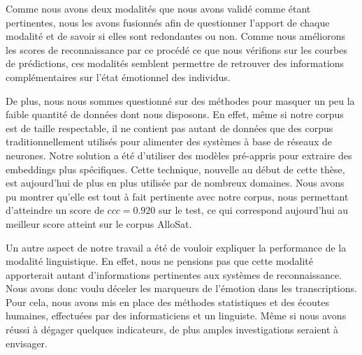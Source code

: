 Comme nous avons deux modalités que nous avons validé comme étant pertinentes, nous les avons fusionnés afin de questionner l'apport de chaque modalité et de savoir si elles sont redondantes ou non. Comme nous améliorons les scores de reconnaissance par ce procédé ce que nous vérifions sur les courbes de prédictions, ces modalités semblent permettre de retrouver des informations complémentaires sur l'état émotionnel des individus.

De plus, nous nous sommes questionné sur des méthodes pour masquer un peu la faible quantité de données dont nous disposons. En effet, même si notre corpus est de taille respectable, il ne contient pas autant de données que des corpus traditionnellement utilisés pour alimenter des systèmes à base de réseaux de neurones. Notre solution a été d'utiliser des modèles pré-appris pour extraire des embeddings plus spécifiques. Cette technique, nouvelle au début de cette thèse, est aujourd'hui de plus en plus utilisée par de nombreux domaines. Nous avons pu montrer qu'elle est tout à fait pertinente avec notre corpus, nous permettant d’atteindre un score de $ccc=0.920$ sur le test, ce qui correspond aujourd'hui au meilleur score atteint sur le corpus AlloSat.

Un autre aspect de notre travail a été de vouloir expliquer la performance de la modalité linguistique. En effet, nous ne pensions pas que cette modalité apporterait autant d'informations pertinentes aux systèmes de reconnaissance. Nous avons donc voulu déceler les marqueurs de l'émotion dans les transcriptions. Pour cela, nous avons mis en place des méthodes statistiques et des écoutes humaines, effectuées par des informaticiens et un linguiste. Même si nous avons réussi à dégager quelques indicateurs, de plus amples investigations seraient à envisager.


